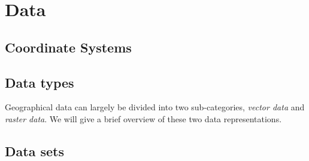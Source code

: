\section{Data}
\label{sec:data}



\subsection{Coordinate Systems}


\subsection{Data types}

Geographical data can largely be divided into two sub-categories, \textit{vector data} and \textit{raster data}.
We will give a brief overview of these two data representations.



\label{sec:raster-data}


\subsection{Data sets}






